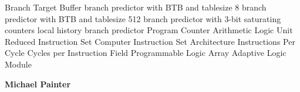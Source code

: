 \documentclass[12pt,twoside,notitlepage]{report}
\begin{document}
 {Branch Target Buffer}
 {branch predictor with BTB and tablesize 8}
 {branch predictor with BTB and tablesize 512}
 {branch predictor with 3-bit saturating counters}
 {local history branch predictor}
 {Program Counter}
 {Arithmetic Logic Unit}
 {Reduced Instruction Set Computer}
 {Instruction Set Architecture}
 {Instructions Per Cycle}
 {Cycles per Instruction}
 {Field Programmable Logic Array}
 {Adaptive Logic Module}


\begin{flushright}
    \Large
    \hfill{\LARGE \bf Michael Painter}
\end{flushright}
\end{document}
